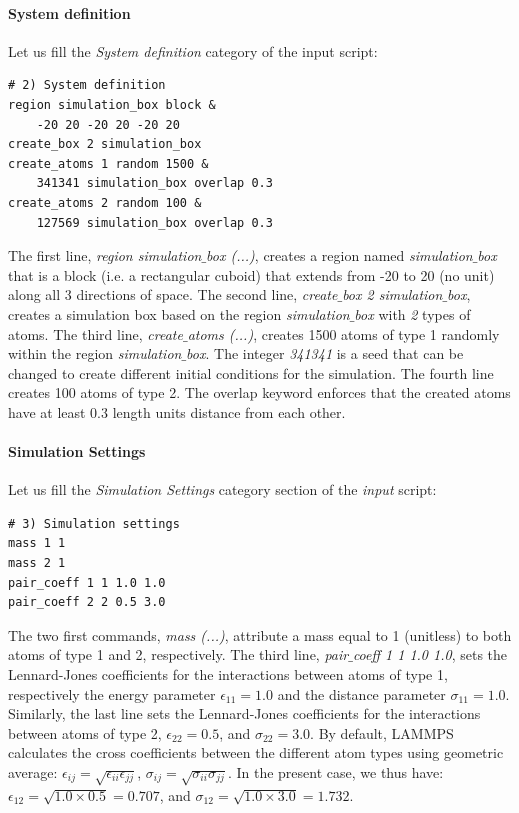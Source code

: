 \documentclass[9pt,tutorial]{livecoms}
\begin{document}
\paragraph{System definition}
Let us fill the \textit{System definition} category of the input script:
{\normalsize \begin{verbatim}
# 2) System definition
region simulation_box block &
    -20 20 -20 20 -20 20
create_box 2 simulation_box
create_atoms 1 random 1500 &
    341341 simulation_box overlap 0.3
create_atoms 2 random 100 &
    127569 simulation_box overlap 0.3
\end{verbatim}}
\noindent The first line, \textit{region simulation$\_$box (...)}, creates a region named \textit{simulation$\_$box} that is a block (i.e. a rectangular cuboid) that extends from -20 to 20 (no unit) along all 3 directions of space. The second line, \textit{create$\_$box 2 simulation$\_$box}, creates a simulation box based on the region \textit{simulation$\_$box} with \textit{2} types of atoms. The third line, \textit{create$\_$atoms (...)}, creates 1500 atoms of type 1 randomly within the region \textit{simulation$\_$box}. The integer \textit{341341} is a seed that can be changed to create different initial conditions for the simulation. The fourth line creates 100 atoms of type 2. The overlap keyword enforces that the created atoms have at least 0.3 length units distance from each other.

\paragraph{Simulation Settings}
Let us fill the \textit{Simulation Settings} category section of the \textit{input} script:
{\normalsize \begin{verbatim}
# 3) Simulation settings
mass 1 1
mass 2 1
pair_coeff 1 1 1.0 1.0
pair_coeff 2 2 0.5 3.0
\end{verbatim}}
The two first commands, \textit{mass (...)}, attribute a mass equal to 1 (unitless) to both atoms of type 1 and 2, respectively. The third line, \textit{pair$\_$coeff 1 1 1.0 1.0}, sets the Lennard-Jones coefficients for the interactions between atoms of type 1, respectively the energy parameter $\epsilon_{11} = 1.0$ and the distance parameter $\sigma_{11} = 1.0$. Similarly, the last line sets the Lennard-Jones coefficients for the interactions between atoms of type 2, $\epsilon_{22} = 0.5$, and $\sigma_{22} = 3.0$. By default, LAMMPS calculates the cross coefficients between the different atom types using geometric average: $\epsilon_{ij} = \sqrt{\epsilon_{ii} \epsilon_{jj}}$, $\sigma_{ij} = \sqrt{\sigma_{ii} \sigma_{jj}}$. In the present case, we thus have: $\epsilon_{12} = \sqrt{1.0 \times 0.5} = 0.707$, and $\sigma_{12} = \sqrt{1.0 \times 3.0} = 1.732$.
\end{document}
